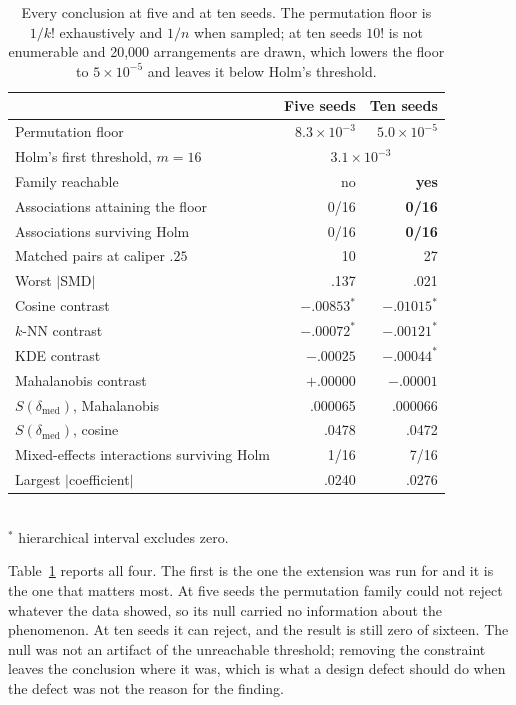 \documentclass[11pt,a4paper]{article}
\begin{document}
\begin{table}[t]
\centering
\caption{Every conclusion at five and at ten seeds. The permutation floor is $1/k!$ exhaustively and $1/n$ when sampled; at ten seeds $10!$ is not enumerable and 20{,}000 arrangements are drawn, which lowers the floor to $5\times10^{-5}$ and leaves it below Holm's threshold.}
\label{tab:seeds}
\small
\begin{tabular}{lrr}
\toprule
& Five seeds & Ten seeds\\
\midrule
Permutation floor & $8.3\times10^{-3}$ & $5.0\times10^{-5}$\\
Holm's first threshold, $m{=}16$ & \multicolumn{2}{c}{$3.1\times10^{-3}$}\\
Family reachable & no & \textbf{yes}\\
Associations attaining the floor & 0/16 & \textbf{0/16}\\
Associations surviving Holm & 0/16 & \textbf{0/16}\\
\midrule
Matched pairs at caliper $.25$ & 10 & 27\\
Worst $|$SMD$|$ & .137 & .021\\
Cosine contrast & $-.00853^\ast$ & $-.01015^\ast$\\
$k$-NN contrast & $-.00072^\ast$ & $-.00121^\ast$\\
KDE contrast & $-.00025$ & $-.00044^\ast$\\
Mahalanobis contrast & $+.00000$ & $-.00001$\\
\midrule
$S(\delta_{\mathrm{med}})$, Mahalanobis & .000065 & .000066\\
$S(\delta_{\mathrm{med}})$, cosine & .0478 & .0472\\
Mixed-effects interactions surviving Holm & 1/16 & 7/16\\
Largest $|$coefficient$|$ & .0240 & .0276\\
\bottomrule
\end{tabular}
\\[2pt]
\footnotesize $^\ast$ hierarchical interval excludes zero.
\end{table}

Table~\ref{tab:seeds} reports all four. The first is the one the extension was
run for and it is the one that matters most. At five seeds the permutation
family could not reject whatever the data showed, so its null carried no
information about the phenomenon. At ten seeds it can reject, and the result is
still zero of sixteen. The null was not an artifact of the unreachable
threshold; removing the constraint leaves the conclusion where it was, which is
what a design defect should do when the defect was not the reason for the
finding.
\end{document}
